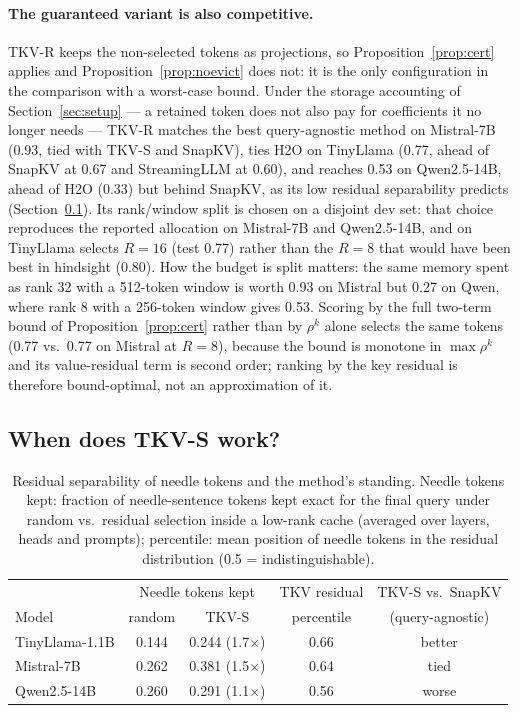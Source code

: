 \documentclass{article}
\begin{document}
\paragraph{The guaranteed variant is also competitive.} TKV-R keeps the
non-selected tokens as projections, so Proposition~\ref{prop:cert} applies and
Proposition~\ref{prop:noevict} does not: it is the only configuration in the
comparison with a worst-case bound. Under the storage accounting of
Section~\ref{sec:setup} --- a retained token does not also pay for coefficients
it no longer needs --- TKV-R matches the best query-agnostic method on
Mistral-7B (0.93, tied with TKV-S and SnapKV), ties H2O on TinyLlama (0.77,
ahead of SnapKV at 0.67 and StreamingLLM at 0.60), and reaches 0.53 on
Qwen2.5-14B, ahead of H2O (0.33) but behind SnapKV, as its low residual
separability predicts (Section~\ref{sec:diag}). Its rank/window split is
chosen on a disjoint dev set: that choice reproduces the reported allocation on
Mistral-7B and Qwen2.5-14B, and on TinyLlama selects $R{=}16$ (test 0.77)
rather than the $R{=}8$ that would have been best in hindsight (0.80). How the budget is
split matters: the same memory spent as rank 32 with a 512-token window is
worth 0.93 on Mistral but 0.27 on Qwen, where rank 8 with a 256-token window
gives 0.53. Scoring by the
full two-term bound of Proposition~\ref{prop:cert} rather than by $\rho^k$
alone selects the same tokens (0.77 vs.\ 0.77 on Mistral at $R{=}8$), because
the bound is monotone in $\max\rho^k$ and its value-residual term is second
order; ranking by the key residual is therefore bound-optimal, not an
approximation of it.

\subsection{When does TKV-S work?}
\label{sec:diag}

\begin{table}[t]
\centering
\caption{Residual separability of needle tokens and the method's standing.
Needle tokens kept: fraction of needle-sentence tokens kept exact for the
final query under random vs.\ residual selection inside a low-rank cache
(averaged over layers, heads and prompts); percentile: mean position of needle
tokens in the residual distribution (0.5 = indistinguishable).}
\label{tab:diag}
\small
\begin{tabular}{lcccc}
\toprule
& \multicolumn{2}{c}{Needle tokens kept} & TKV residual & TKV-S vs.\ SnapKV \\
Model & random & TKV-S & percentile & (query-agnostic) \\
\midrule
TinyLlama-1.1B & 0.144 & 0.244 (1.7$\times$) & 0.66 & better \\
Mistral-7B     & 0.262 & 0.381 (1.5$\times$) & 0.64 & tied \\
Qwen2.5-14B    & 0.260 & 0.291 (1.1$\times$) & 0.56 & worse \\
\bottomrule
\end{tabular}
\end{table}
\end{document}
